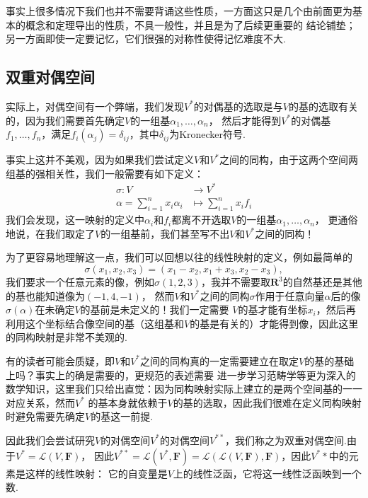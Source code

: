 \begin{enumerate}
    事实上很多情况下我们也并不需要背诵这些性质，一方面这只是几个由前面更为基本的概念和定理导出的性质，不具一般性，并且是为了后续更重要的
    结论铺垫；另一方面即使一定要记忆，它们很强的对称性使得记忆难度不大.
\end{enumerate}

\subsection{双重对偶空间}
实际上，对偶空间有一个弊端，我们发现$V^*$的对偶基的选取是与$V$的基的选取有关的，因为我们需要首先确定$V$的一组基$\alpha_1,\ldots,\alpha_n$，
然后才能得到$V^*$的对偶基$f_1,\ldots,f_n$，满足$f_i(\alpha_j)=\delta_{ij}$，其中$\delta_{ij}$为Kronecker符号.

事实上这并不美观，因为如果我们尝试定义$V$和$V^*$之间的同构，由于这两个空间两组基的强相关性，我们一般需要有如下定义：
\begin{align*}
    \sigma:V&\to V^* \\
    \alpha=\sum_{i=1}^nx_i\alpha_i&\mapsto\sum_{i=1}^nx_if_i
\end{align*}
我们会发现，这一映射的定义中$\alpha_i$和$f_i$都离不开选取$V$的一组基$\alpha_1,\ldots,\alpha_n$，
更通俗地说，在我们取定了$V$的一组基前，我们甚至写不出$V$和$V^*$之间的同构！

为了更容易地理解这一点，我们可以回想以往的线性映射的定义，例如最简单的
\[\sigma(x_1,x_2,x_3)=(x_1-x_2,x_1+x_3,x_2-x_3),\]
我们要求一个任意元素的像，例如$\sigma(1,2,3)$，我并不需要取$\mathbf{R}^3$的自然基还是其他的基也能知道像为$(-1,4,-1)$，
然而$V$和$V^*$之间的同构$\sigma$作用于任意向量$\alpha$后的像$\sigma(\alpha)$在未确定$V$的基前是未定义的！我们一定需要
$V$的基才能有坐标$x_i$，然后再利用这个坐标结合像空间的基（这组基和$V$的基是有关的）才能得到像，因此这里的同构映射是非常不美观的.

有的读者可能会质疑，即$V$和$V^*$之间的同构真的一定需要建立在取定$V$的基的基础上吗？事实上的确是需要的，更规范的表述需要
进一步学习范畴学等更为深入的数学知识，这里我们只给出直觉：因为同构映射实际上建立的是两个空间基的一一对应关系，然而$V^*$
的基本身就依赖于$V$的基的选取，因此我们很难在定义同构映射时避免需要先确定$V$的基这一前提.

因此我们会尝试研究$V$的对偶空间$V^*$的对偶空间$V^{**}$，我们称之为双重对偶空间.由于$V^*=\mathcal{L}(V,\mathbf{F})$，
因此$V^{**}=\mathcal{L}(V^*,\mathbf{F})=\mathcal{L}(\mathcal{L}(V,\mathbf{F}),\mathbf{F})$，因此$V^**$中的元素是这样的线性映射：
它的自变量是$V$上的线性泛函，它将这一线性泛函映到一个数.

